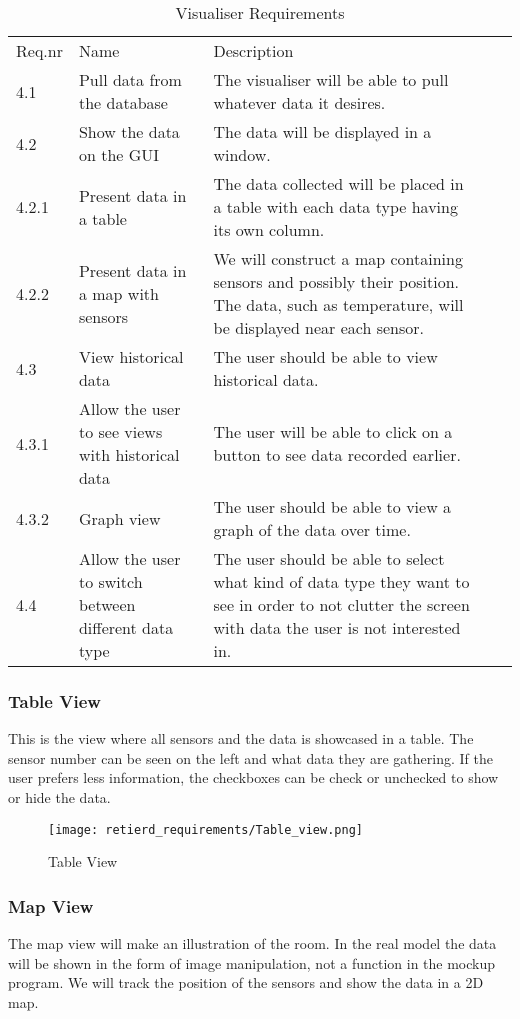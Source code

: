 \documentclass[../document]{subfiles}
\begin{document}
\begin{table}[H]
\caption{Visualiser Requirements}
\centering
\begin{tabularx}{\textwidth}{|l|X|X|l|X|}
\hline
\\ \hline Req.nr
&Name
&Description
\\ \hline 4.1
&Pull data from the database
&The visualiser will be able to pull whatever data it desires.
\\ \hline 4.2
&Show the data on the GUI
&The data will be displayed in a window.
\\ \hline 4.2.1
&Present data in a table
&The data collected will be placed in a table with each data type having its own column.
\\ \hline 4.2.2
&Present data in a map with sensors
&We will construct a map containing sensors and possibly their position. The data, such as temperature, will be displayed near each sensor.
\\ \hline 4.3
&View historical data
&The user should be able to view historical data.
\\ \hline 4.3.1
&Allow the user to see views with historical data
&The user will be able to click on a button to see data recorded earlier.
\\ \hline 4.3.2
&Graph view
&The user should be able to view a graph of the data over time.
\\ \hline 4.4
&Allow the user to switch between different data type
&The user should be able to select what kind of data type they want to see in order to not clutter the screen with data the user is not interested in.
\\ \hline 
\end{tabularx}
\end{table}

\newpage
\subsubsection{Table View}
This is the view where all sensors and the data is showcased in a table. The sensor number can be seen on the left and what data they are gathering. If the user prefers less information, the checkboxes can be check or unchecked to show or hide the data.

\begin{figure}[H]
	\centering
	\texttt{[image: retierd\_requirements/Table\_view.png]}
	\caption{Table View}
\end{figure}

\newpage
\subsubsection{Map View}
The map view will make an illustration of the room. In the real model the data will be shown in the form of image manipulation, not a function in the mockup program. We will track the position of the sensors and show the data in a 2D map.
\end{document}
